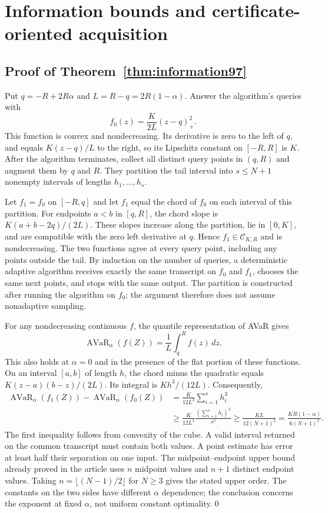 \section{Information bounds and certificate-oriented acquisition}\label{sec:proofs97}
\subsection{Proof of Theorem~\ref{thm:information97}}
Put $q=-R+2R\alpha$ and $L=R-q=2R(1-\alpha)$. Answer the algorithm's queries with
\[
 f_0(z)=\frac{K}{2L}(z-q)_+^2.
\]
This function is convex and nondecreasing. Its derivative is zero to the left of $q$, and equals $K(z-q)/L$ to the right, so its Lipschitz constant on $[-R,R]$ is $K$. After the algorithm terminates, collect all distinct query points in $(q,R)$ and augment them by $q$ and $R$. They partition the tail interval into $s\leq N+1$ nonempty intervals of lengths $h_1,\ldots,h_s$.

Let $f_1=f_0$ on $[-R,q]$ and let $f_1$ equal the chord of $f_0$ on each interval of this partition. For endpoints $a<b$ in $[q,R]$, the chord slope is $K(a+b-2q)/(2L)$. These slopes increase along the partition, lie in $[0,K]$, and are compatible with the zero left derivative at $q$. Hence $f_1\in\mathcal C_{K,R}$ and is nondecreasing. The two functions agree at every query point, including any points outside the tail. By induction on the number of queries, a deterministic adaptive algorithm receives exactly the same transcript on $f_0$ and $f_1$, chooses the same next points, and stops with the same output. The partition is constructed after running the algorithm on $f_0$; the argument therefore does not assume nonadaptive sampling.

For any nondecreasing continuous $f$, the quantile representation of AVaR gives
\[
 \operatorname{AVaR}_\alpha(f(Z))=\frac{1}{L}\int_q^R f(z)\,dz.
\]
This also holds at $\alpha=0$ and in the presence of the flat portion of these functions. On an interval $[a,b]$ of length $h$, the chord minus the quadratic equals $K(z-a)(b-z)/(2L)$. Its integral is $Kh^3/(12L)$. Consequently,
\begin{align*}
 \operatorname{AVaR}_\alpha(f_1(Z))-\operatorname{AVaR}_\alpha(f_0(Z))
 &=\frac{K}{12L^2}\sum_{i=1}^s h_i^3\\
 &\geq \frac{K}{12L^2}\frac{(\sum_{i=1}^s h_i)^3}{s^2}
 \geq\frac{KL}{12(N+1)^2}
 =\frac{KR(1-\alpha)}{6(N+1)^2}.
\end{align*}
The first inequality follows from convexity of the cube. A valid interval returned on the common transcript must contain both values. A point estimate has error at least half their separation on one input. The midpoint--endpoint upper bound already proved in the article uses $n$ midpoint values and $n+1$ distinct endpoint values. Taking $n=\lfloor(N-1)/2\rfloor$ for $N\geq3$ gives the stated upper order. The constants on the two sides have different $\alpha$ dependence; the conclusion concerns the exponent at fixed $\alpha$, not uniform constant optimality.\qed

